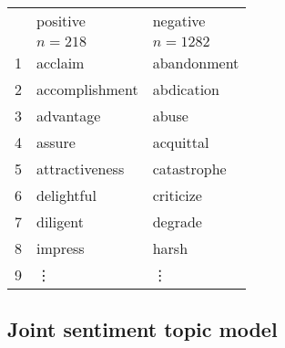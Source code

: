 \begin{table}[ht]
\centering
\begin{tabular}{rll}
  \hline
 & positive & negative \\ 
 & $n = 218$ & $n = 1282$ \\ 
  \hline
  1 & acclaim & abandonment \\ 
  2 & accomplishment & abdication \\ 
  3 & advantage & abuse \\ 
  4 & assure & acquittal \\ 
  5 & attractiveness & catastrophe \\ 
  6 & delightful & criticize \\ 
  7 & diligent & degrade \\ 
  8 & impress & harsh \\ 
  9 & \vdots & \vdots \\ 
  
   \hline
\end{tabular}
\end{table}

\subsection{Joint sentiment topic model}\label{JST}

